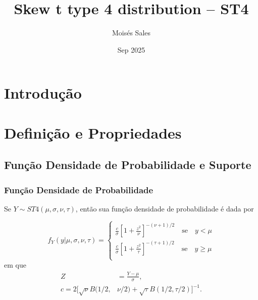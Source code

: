 \documentclass[13pt, aspectratio=169]{beamer}
\title{Skew t type 4 distribution -- ST4}
\author{Moisés Sales}
\date{Sep 2025}
\begin{document}
\maketitle
\section{Introdução}

\section{Definição e Propriedades}

\subsection{Função Densidade de Probabilidade e Suporte}

\begin{frame}
    \frametitle{Função Densidade de Probabilidade}
    Se $Y \sim ST4(\mu, \sigma, \nu, \tau)$, então sua função densidade de probabilidade é dada por

    \begin{equation*}
        f_Y(y | \mu, \sigma, \nu, \tau) =
            \begin{cases}
                \frac{c}{\sigma} \left[ 1 + \frac{z^2}{\nu} \right]^{-(\nu + 1)/2} \quad \text{se} \quad y < \mu \\
                \frac{c}{\sigma} \left[ 1 + \frac{z^2}{\tau} \right]^{-(\tau + 1)/2} \quad \text{se} \quad y \geq \mu \\
            \end{cases}
    \end{equation*}
    \pause
    \qquad em que
    \begin{align*}
        Z &= \frac{Y - \mu}{\sigma}, \\
        c = 2 [\sqrt{\nu} B(1/2, &\nu/2) + \sqrt{\tau} B(1/2, \tau/2)]^{-1}.
    \end{align*}
\end{frame}
\end{document}
